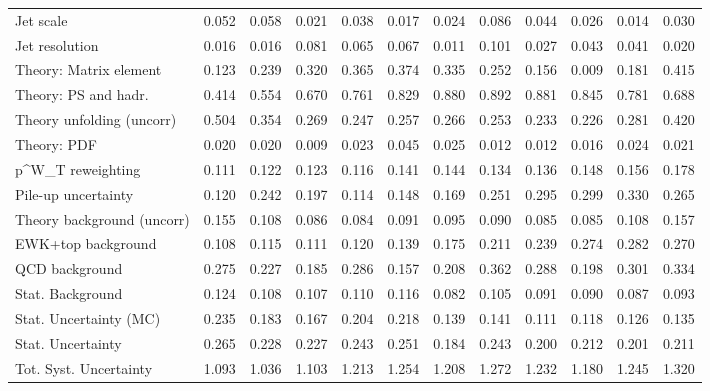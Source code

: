 \begin{tabular}{l|p{0.6cm}p{0.6cm}p{0.6cm}p{0.6cm}p{0.6cm}p{0.6cm}p{0.6cm}p{0.6cm}p{0.6cm}p{0.6cm}p{0.6cm}}
Jet scale                                & 0.052 & 0.058 & 0.021 & 0.038 & 0.017 & 0.024 & 0.086 & 0.044 & 0.026 & 0.014 & 0.030 \\
Jet resolution                           & 0.016 & 0.016 & 0.081 & 0.065 & 0.067 & 0.011 & 0.101 & 0.027 & 0.043 & 0.041 & 0.020 \\
Theory: Matrix element                   & 0.123 & 0.239 & 0.320 & 0.365 & 0.374 & 0.335 & 0.252 & 0.156 & 0.009 & 0.181 & 0.415 \\
Theory: PS and hadr.                     & 0.414 & 0.554 & 0.670 & 0.761 & 0.829 & 0.880 & 0.892 & 0.881 & 0.845 & 0.781 & 0.688 \\
Theory unfolding (uncorr)                & 0.504 & 0.354 & 0.269 & 0.247 & 0.257 & 0.266 & 0.253 & 0.233 & 0.226 & 0.281 & 0.420 \\
Theory: PDF                              & 0.020 & 0.020 & 0.009 & 0.023 & 0.045 & 0.025 & 0.012 & 0.012 & 0.016 & 0.024 & 0.021 \\
p^{W}_{T} reweighting                    & 0.111 & 0.122 & 0.123 & 0.116 & 0.141 & 0.144 & 0.134 & 0.136 & 0.148 & 0.156 & 0.178 \\
Pile-up uncertainty                      & 0.120 & 0.242 & 0.197 & 0.114 & 0.148 & 0.169 & 0.251 & 0.295 & 0.299 & 0.330 & 0.265 \\
Theory background (uncorr)               & 0.155 & 0.108 & 0.086 & 0.084 & 0.091 & 0.095 & 0.090 & 0.085 & 0.085 & 0.108 & 0.157 \\
EWK+top background                       & 0.108 & 0.115 & 0.111 & 0.120 & 0.139 & 0.175 & 0.211 & 0.239 & 0.274 & 0.282 & 0.270 \\
QCD background                           & 0.275 & 0.227 & 0.185 & 0.286 & 0.157 & 0.208 & 0.362 & 0.288 & 0.198 & 0.301 & 0.334 \\
Stat. Background                         & 0.124 & 0.108 & 0.107 & 0.110 & 0.116 & 0.082 & 0.105 & 0.091 & 0.090 & 0.087 & 0.093 \\
Stat. Uncertainty (MC)                   & 0.235 & 0.183 & 0.167 & 0.204 & 0.218 & 0.139 & 0.141 & 0.111 & 0.118 & 0.126 & 0.135 \\
\hline
Stat. Uncertainty                        & 0.265 & 0.228 & 0.227 & 0.243 & 0.251 & 0.184 & 0.243 & 0.200 & 0.212 & 0.201 & 0.211 \\
\hline
Tot. Syst. Uncertainty                   & 1.093 & 1.036 & 1.103 & 1.213 & 1.254 & 1.208 & 1.272 & 1.232 & 1.180 & 1.245 & 1.320 \\
\hline
\end{tabular}

